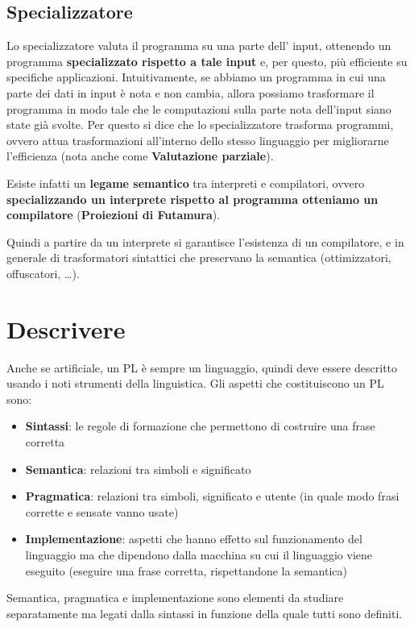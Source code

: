 \documentclass[12pt,a4paper]{article}
\begin{document}
\subsection{Specializzatore}
Lo specializzatore valuta il programma su una parte dell' input, ottenendo un programma \textbf{specializzato rispetto a tale input} e, per questo, più efficiente su specifiche applicazioni. Intuitivamente, se abbiamo un programma in cui una parte dei dati in input è nota e non cambia, allora possiamo trasformare il programma in modo tale che le computazioni sulla parte nota dell'input siano state già svolte. Per questo si dice che lo specializzatore trasforma programmi, ovvero attua trasformazioni all'interno dello stesso linguaggio per migliorarne l'efficienza (nota anche come \textbf{Valutazione parziale}).

Esiste infatti un \textbf{legame semantico} tra interpreti e compilatori, ovvero \textbf{specializzando un interprete rispetto al programma otteniamo un compilatore} (\textbf{Proiezioni di Futamura}).

Quindi a partire da un interprete si garantisce l'esistenza di un compilatore, e in generale di trasformatori sintattici che preservano la semantica (ottimizzatori, offuscatori, \ldots).
\clearpage
\section{Descrivere} \label{Descrivere}
Anche se artificiale, un PL è sempre un linguaggio, quindi deve essere descritto usando i noti strumenti della linguistica.
Gli aspetti che costituiscono un PL sono:
\begin{itemize}
\item \textbf{Sintassi}: le regole di formazione che permettono di costruire una frase corretta
\item \textbf{Semantica}: relazioni tra simboli e significato
\item \textbf{Pragmatica}: relazioni tra simboli, significato e utente (in quale modo frasi corrette e sensate vanno usate)
\item \textbf{Implementazione}: aspetti che hanno effetto sul funzionamento del linguaggio ma che
dipendono dalla macchina su cui il linguaggio viene eseguito (eseguire una frase corretta, rispettandone la semantica)
\end{itemize}
Semantica, pragmatica e implementazione sono elementi da studiare separatamente ma legati dalla sintassi in funzione della quale tutti sono definiti.
\end{document}
